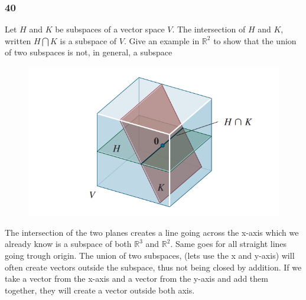     \subsubsection*{40}
    Let $ H $ and  $ K $ be subspaces of a vector space $ V $. The intersection of $ H $ and $ K $, written $ H \bigcap K $ is a subspace of $ V $. Give an example in $ \mathbb R^{2}  $ to show that the union of two subspaces is not, in general, a subspace 
    \begin{figure}[h!]
      \centering
      \includegraphics[scale = .7]{Bilder/HK_intersect.png}
      \caption{}
      \label{fig:figure1}
    \end{figure}
    \newline \newline 

    The intersection of the two planes creates a line going across the x-axis which we already know is a subspace of both $ \mathbb R^{3} $ and $ \mathbb R^{2} $. Same goes for all straight lines going trough origin. \newline 
    The union of two subspaces, (lets use the x and y-axis) will often create vectors outside the subspace, thus not being closed by addition. If we take a vector from the x-axis and a vector from the y-axis and add them together, they will create a vector outside both axis. 

